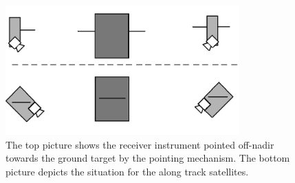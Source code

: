 \begin{figure}
\centering
\includegraphics[width=0.8\textwidth]{chapters/img/pointingoptions.png}
\caption[Pointing options in cross track and along track configurations]{The top picture shows the receiver instrument pointed off-nadir towards the ground target by the pointing mechanism. The bottom picture depicts the situation for the along track satellites.}
\label{fig:pointattitude}
\end{figure}
